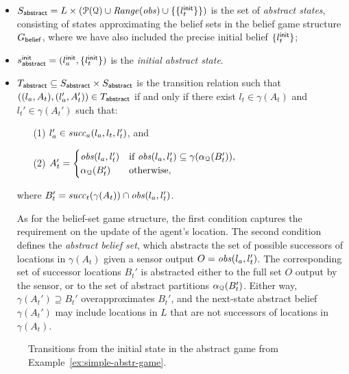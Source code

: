 \begin{itemize}
\item $S_{\mathsf{abstract}} = L \times (\mathcal P(\mathcal{Q}) \cup \mathit{Range}(\mathit{obs}) \cup \{\{l_t^{\mathsf{init}}\}\})$  is the set of \emph{abstract states}, consisting of states approximating the belief sets in the belief game structure $G_{\mathsf{belief}}$, where we have also included the precise initial belief $\{l_t^{\mathsf{init}}\}$;
\item $s^{\mathsf{init}}_{\mathsf{abstract}} = (l_a^{\mathsf{init}},\{l_t^{\mathsf{init}}\})$ is the \emph{initial abstract state}.
\item $T_{\mathsf{abstract}} \subseteq S_{\mathsf{abstract}} \times S_{\mathsf{abstract}}$ is the transition relation such that $((l_a, A_t),(l_a', A_t')) \in T_{\mathsf{abstract}}$ if and only if there exist $l_t \in \gamma(A_t)$ and $l_t' \in \gamma(A_t')$ such that:
\begin{itemize}
\item[(1)] $l_a' \in \mathit{succ}_a(l_a,l_t,l_t')$, and 
\item[(2)] $A_t' = \begin{cases}
\mathit{obs}(l_a,l_t') & \text{if }  \mathit{obs}(l_a,l_t') \subseteq \gamma(\alpha_{\mathcal{Q}}(B_t')),\\
\alpha_{\mathcal{Q}}(B_t') & \text{otherwise}, 
\end{cases}$
\end{itemize}
where $B_t' = \mathit{succ}_t(\gamma(A_t)) \cap \mathit{obs}(l_a,l_t')$.

\smallskip

As for the belief-set game structure, the first condition captures the requirement on the update of the agent's location. The second condition defines the \emph{abstract belief set}, which abstracts the set of possible successors of locations in $\gamma(A_t)$ given a sensor output $O=\mathit{obs}(l_a,l_t')$. The corresponding set of successor locations $B_t'$ is abstracted either to the full set $O$ output by the sensor, or to the set of abstract partitions $\alpha_{\mathcal{Q}}(B_t')$. Either way, $\gamma(A_t') \supseteq B_t'$ overapproximates $B_t'$, and the next-state abstract belief $\gamma(A_t')$ may include locations in $L$ that are not successors of locations in $\gamma(A_t)$.
\end{itemize}



\begin{figure}
\centering
{}
\hfill
{}
\caption{Transitions from the initial state in the abstract game from Example~\ref{ex:simple-abstr-game}.}
\end{figure}

